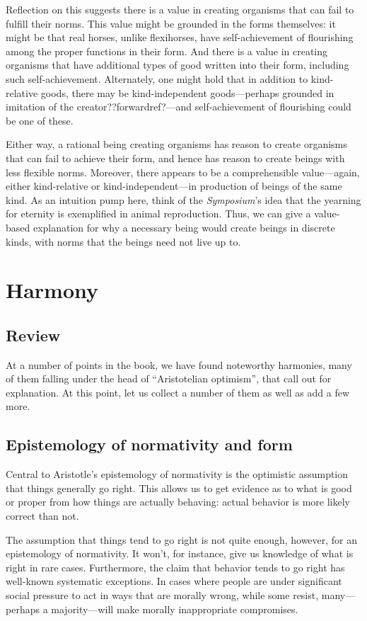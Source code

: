 Reflection on this suggests there is a value in creating organisms that can fail to fulfill their norms. This value might be
grounded in the forms themselves: it might be that real horses, unlike flexihorses, have self-achievement of flourishing among the
proper functions in their form. And there is a value in creating organisms that have additional types of good written into their
form, including such self-achievement. Alternately, one might hold that in addition to kind-relative goods, there may be
kind-independent goods---perhaps grounded in imitation of the creator??forwardref?---and self-achievement of flourishing
could be one of these. 

Either way, a rational being creating organisms has reason to create organisms that can fail to achieve their form, and hence
has reason to create beings with less flexible norms. Moreover, there appears to be a comprehensible value---again, either 
kind-relative or kind-independent---in production of beings of the same kind. As an intuition pump here, think of the
\textit{Symposium}'s idea that the yearning for eternity is exemplified in animal reproduction. Thus, we can give a value-based
explanation for why a necessary being would create beings in discrete kinds, with norms that the beings need not live up to.

\section{Harmony}
\subsection{Review}
At a number of points in the book, we have found noteworthy harmonies, many of them falling under the head of ``Aristotelian optimism'', that call out for explanation. At this point, let us collect a number of them as well as add a few more.

\subsection{Epistemology of normativity and form}\label{sec:epist-of-form}
Central to Aristotle's epistemology of normativity is the optimistic assumption that things generally go right.
This allows us to get evidence as to what is good or proper from how things are actually behaving: actual behavior 
is more likely correct than not.

The assumption that things tend to go right is not quite enough, however, for an epistemology of normativity. 
It won't, for instance, give us knowledge of what is right in rare cases. Furthermore, the claim that behavior
tends to go right has well-known systematic exceptions. In cases where people are under significant social pressure
to act in ways that are morally wrong, while some resist, many---perhaps a majority---will make morally inappropriate
compromises. 

